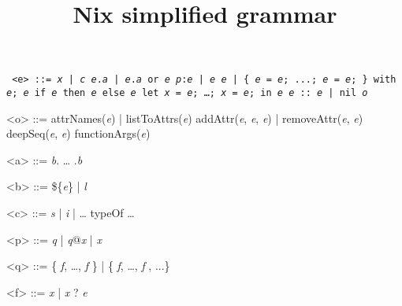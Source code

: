 \documentclass{article}
\title{Nix simplified grammar}
\date{}
\newcommand{\meta}[1]{\emph{\textsl{#1}}} %
\renewcommand{\|}{\textrm{|}}
\def\e/{\meta{e}}
\def\a/{\meta{a}}
\def\b/{\meta{b}}
\def\c/{\meta{c}}
\def\p/{\meta{p}}
\def\q/{\meta{q}}
\def\f/{\meta{f}}
\def\x/{\meta{x}}
\def\o/{\meta{o}}
\begin{document}
\maketitle{}

\begin{grammar}
  \tt
<e> ::=
    \x/ \| \c/
  \alt \e/.\a/ \| \e/.\a/ or \e/
  \alt \p/:\e/ \| \e/ \e/
  \alt [ \e/ \ldots{} \e/ ] \| \{ \e/ = \e/; ...; \e/ = \e/; \}
  \alt with \e/; \e/
  \alt if \e/ then \e/ else \e/
  \alt let \x/ = \e/; \ldots{;} \x/ = \e/; in \e/
  \alt \e/ :: \e/ \| nil
  \alt \o/

  <o> ::= attrNames(\e/) \| listToAttrs(\e/)
  \alt addAttr(\e/, \e/, \e/) \| removeAttr(\e/, \e/)
  \alt deepSeq(\e/, \e/)
  \alt functionArgs(\e/)

<a> ::= \b/. \ldots{} .\b/

<b> ::= \$\{\e/\} \| \meta{l}

<c> ::= \meta{s} \| \meta{i} \| \ldots{}
  \alt typeOf
  \alt \ldots{}

<p> ::= \q/ \| \q/@\x/ \| \x/

<q> ::= \{ \f/, \ldots{,} \f/ \} \| \{ \f/, \ldots{,} \f/ , ...\}

<f> ::= \x/ \| \x/ ? \e/

\end{grammar}
\end{document}
